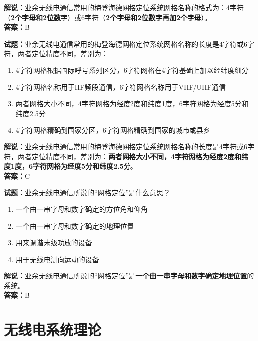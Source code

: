 \documentclass{ctexbook}
\begin{document}
\noindent\textbf{解说：}业余无线电通信常用的梅登海德网格定位系统网格名称的格式为：4字符（\textbf{2个字母和2位数字}）或6字符（\textbf{2个字母和2位数字再加2个字母}）。\\\noindent\textbf{答案：}B


\bigskip


\noindent\textbf{试题：}业余无线电通信常用的梅登海德网格定位系统网格名称的长度是4字符或6字符，两者定位精度不同，差别为：

\begin{enumerate}[leftmargin=3em]
	\item 4字符网格根据国际呼号系列区分，6字符网格在4字符基础上加以经纬度细分
	\item 4字符网格名称用于HF频段通信，6字符网格名称用于VHF/UHF通信
	\item 两者网格大小不同，4字符网格为经度2度和纬度1度，6字符网格为经度5分和纬度2.5分
	\item 4字符网格精确到国家分区，6字符网格精确到国家的城市或县乡
\end{enumerate}

\noindent\textbf{解说：}业余无线电通信常用的梅登海德网格定位系统网格名称的长度是4字符或6字符，两者定位精度不同，差别为：\textbf{两者网格大小不同，4字符网格为经度2度和纬度1度，6字符网格为经度5分和纬度2.5分}。\\\noindent\textbf{答案：}C

\bigskip


\noindent\textbf{试题：}业余无线电通信所说的“网格定位”是什么意思？

\begin{enumerate}[leftmargin=3em]
	\item 一个由一串字母和数字确定的方位角和仰角
	\item 一个由一串字母和数字确定的地理位置
	\item 用来调谐末级功放的设备
	\item 用于无线电测向运动的设备
\end{enumerate}

\noindent\textbf{解说：}业余无线电通信所说的“网格定位”是\textbf{一个由一串字母和数字确定地理位置}的系统。\\\noindent\textbf{答案：}B








\chapter{无线电系统理论}
\end{document}
